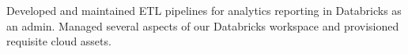\documentclass[
  a4paper, 
]{FormatDetails}
\begin{document}
\begin{cvtable}
    \vspace{2mm}
    {Developed and maintained ETL pipelines for analytics reporting in Databricks as an admin. Managed several aspects of our Databricks workspace and provisioned requisite cloud assets.}
    \vspace{2mm}

\end{cvtable}
\end{document}

